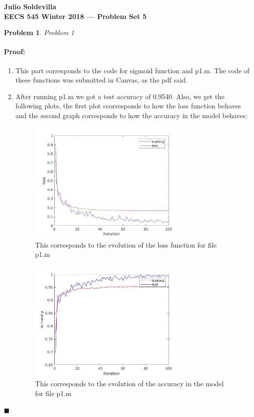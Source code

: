 \documentclass[12pt]{article}
\newenvironment{proof}{\paragraph{Proof: }}{\hfill$\blacksquare$}
\newtheorem{problem}{Problem}%
\begin{document}
\begin{center}
{\bf Julio Soldevilla}
\\
{\bf EECS 545 Winter 2018 --- Problem Set 5 }
\end{center}

\begin{problem}
\normalfont
Problem 1
\end{problem}

\begin{proof}
\begin{enumerate}

\item This part corresponds to the code for sigmoid function and p1.m. The code of these functions was submitted in Canvas, as the pdf said.

\item After running p1.m we got a test accuracy of 0.9540. Also, we get the following plots, the first plot ccorresponds to how the loss function behaves and the second graph corresponds to how the accuracy in the model behaves:

\begin{figure}[!htbp]
\centering
\includegraphics[width=8cm]{loss_p1.jpg}
\caption{This corresponds to the evolution of the loss function for file p1.m}
\end{figure}

\begin{figure}[!htbp]
\centering
\includegraphics[width=8cm]{accuracy_p1.jpg}
\caption{This corresponds to the evolution of the accuracy in the model for file p1.m}
\end{figure}


\end{enumerate}
\end{proof}
\end{document}

